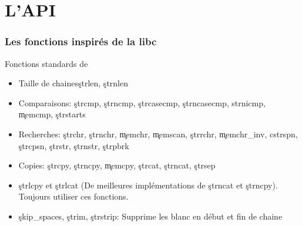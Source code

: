 %
%
%

\part{L'API}

\section{Les fonctions inspirés de la libc}

\begin{frame}{Fonctions standards de }
  \begin{itemize} 
  \item Taille de chaines\c{strlen}, \c{strnlen}
  \item   Comparaisons:   \c{strcmp},   \c{strncmp},   \c{strcasecmp},
    \c{strncasecmp}, \c{ strnicmp}, \c{memcmp}, \c{strstarts}
  \item Recherches:  \c{strchr}, \c{strnchr}, \c{memchr}, \c{memscan},
    \c{strrchr},  \c{memchr_inv}, c{strspn},  \c{strcpsn}, \c{strstr},
    \c{strnstr}, \c{strpbrk}
  \item  Copies:   \c{strcpy},  \c{strncpy},  \c{memcpy},  \c{strcat},
    \c{strncat}, \c{strsep}
  \item \c{strlcpy}  et \c{strlcat} (De  meilleures implémentations de
    \c{strncat} et \c{strncpy}). Toujours utiliser ces fonctions.
  \item \c{skip_spaces},  \c{strim}, \c{strstrip}: Supprime  les blanc
    en début et fin de chaine
  \end{itemize}
\end{frame}

